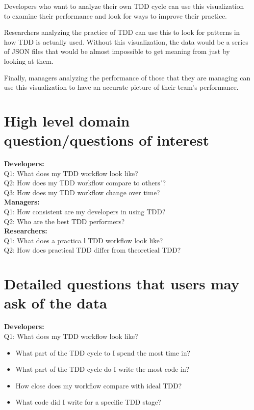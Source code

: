 \documentclass[journal]{vgtc}                %
\begin{document}
Developers who want to analyze their own TDD cycle can use this visualization to examine their performance and look for ways to improve their practice.

Researchers analyzing the practice of TDD can use this to look for patterns in how TDD is actually used.  Without this visualization, the data would be a series of JSON files that would be almost impossible to get meaning from just by looking at them.  

Finally, managers analyzing the performance of those that they are managing can use this visualization to have an accurate picture of their team's performance.

\section{High level domain question/questions of interest}

\textbf{Developers:} \\
Q1: What does my TDD workflow look like? \\
Q2: How does my TDD workflow compare to others'? \\
Q3: How does my TDD workflow change over time? \\

\textbf{Managers:} \\
Q1: How consistent are my developers in using TDD? \\
Q2: Who are the best TDD performers? \\

\textbf{Researchers:} \\
Q1: What does a practica l TDD workflow look like? \\
Q2: How does practical TDD differ from theoretical TDD? \\

\section{Detailed questions that users may ask of the data}

\textbf{Developers:} \\
Q1: What does my TDD workflow look like? 
\begin{itemize}
	\item What part of the TDD cycle to I spend the most time in?
	\item What part of the TDD cycle do I write the most code in?
	\item How close does my workflow compare with ideal TDD?
	\item What code did I write for a specific TDD stage?
\end{itemize}
\end{document}
